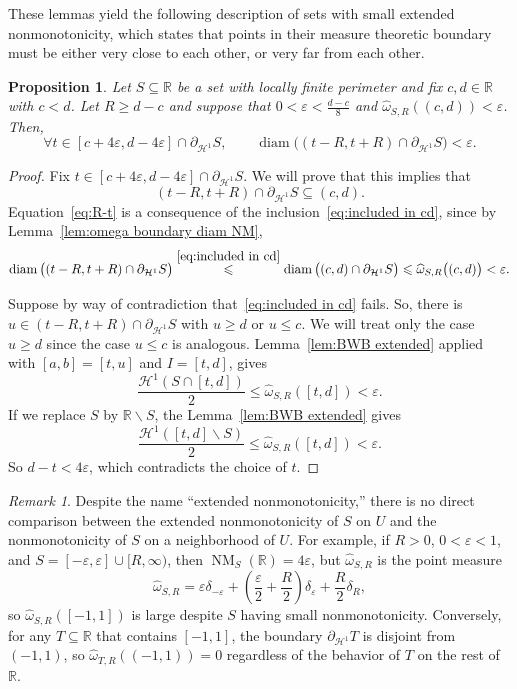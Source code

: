 \documentclass[11pt,reqno]{amsart}
\newcommand{\R}{\mathbb{R}}
\newcommand{\cH}{\mathcal{H}}
\renewcommand{\epsilon}{\varepsilon}
\newcommand{\0}{\mathbf{0}}
\renewcommand{\1}{\mathbf 1}
\renewcommand{\subset}{\subseteq}
\renewcommand{\ge}{\geqslant}
\renewcommand{\le}{\leqslant}
\renewcommand{\setminus}{\smallsetminus}
\newtheorem{prop}[thm]{Proposition}
\theoremstyle{remark}
\newtheorem{remark}[thm]{Remark}
\DeclareMathOperator{\NM}{NM}
\DeclareMathOperator{\diam}{diam}
\begin{document}
These lemmas yield  the following description of sets with small extended nonmonotonicity, which states that points in their measure theoretic boundary  must be either very close to each other, or very far from each other.
\begin{prop}
  Let $S\subset \R$ be a set with locally finite perimeter and fix $c,d\in \R$ with $c<d$.  Let $R\ge d-c$ and suppose that $0<\epsilon<\frac{d-c}{8}$ and $\widehat{\omega}_{S,R}((c,d))<\epsilon$.   Then,
\begin{equation}\label{eq:R-t}
  \forall  t\in  [c+4\epsilon,d-4\epsilon]\cap \partial_{\cH^1}S,\qquad \diam\big( (t-R,t+R)\cap \partial_{\cH^1} S\big)<\epsilon.
  \end{equation}
\end{prop}
\begin{proof}
  Fix $t\in  [c+4\epsilon,d-4\epsilon]\cap \partial_{\cH^1}S$.  We will prove that this implies that
  \begin{equation}\label{eq:included in cd}
    (t-R,t+R)\cap \partial_{\cH^1}S\subset  (c,d).
  \end{equation}
  Equation~\eqref{eq:R-t} is a consequence of the inclusion~\eqref{eq:included in cd}, since by  Lemma~\ref{lem:omega boundary diam NM},
    $$\diam \big((t-R,t+R)\cap \partial_{\cH^1}S\big) \stackrel{\eqref{eq:included in cd}}{\le} \diam \big((c,d)\cap \partial_{\cH^1}S\big)  \le \widehat{\omega}_{S,R}\big((c,d)\big)<\epsilon.$$

  Suppose by way of contradiction that~\eqref{eq:included in cd} fails. So, there is $u\in (t-R,t+R)\cap \partial_{\cH^1}S$ with $u\ge d$ or $u\le c$. We will treat only the case $u\ge d$ since the case $u\le c$ is analogous. Lemma~\ref{lem:BWB extended} applied with $[a,b]=[t,u]$ and $I=[t,d]$, gives
  $$\frac{\cH^1(S\cap [t,d])}{2}\le \widehat{\omega}_{S, R}([t,d])<\epsilon.$$
  If we replace $S$ by $\R\setminus S$, the Lemma~\ref{lem:BWB extended} gives
  $$\frac{\cH^1([t,d]\setminus S)}{2}\le \widehat{\omega}_{S, R}([t,d])<\epsilon.$$
  So $d-t<4\epsilon$, which contradicts the choice of $t$.
\end{proof}

\begin{remark}\label{rem:ENM-vs-NM}
  Despite the name ``extended nonmonotonicity,'' there is no direct comparison between the extended nonmonotonicity of $S$ on $U$ and the nonmonotonicity of $S$ on a neighborhood of $U$. For example, if $R>0$, $0<\epsilon<1$, and $S=[-\epsilon,\epsilon] \cup [R,\infty)$, then $\NM_S(\R)=4\epsilon$, but $\widehat{\omega}_{S,R}$ is the point measure
  $$\widehat{\omega}_{S,R}=\epsilon\delta_{-\epsilon} + \left(\frac{\epsilon}{2}+\frac{R}{2}\right)\delta_{\epsilon} + \frac{R}{2}\delta_{R},$$
  so $\widehat{\omega}_{S,R}([-1,1])$ is large despite $S$ having small nonmonotonicity. Conversely, for any $T\subset \R$ that contains $[-1,1]$, the boundary $\partial_{\cH^1} T$ is disjoint from $(-1,1)$, so $\widehat{\omega}_{T,R}((-1,1))=0$ regardless of the behavior of $T$ on the rest of $\R$.
\end{remark}
\end{document}
